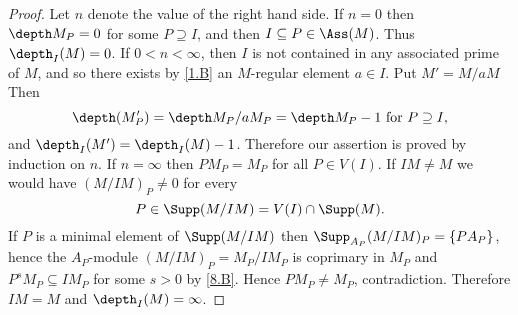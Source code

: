 \documentclass[../main]{subfiles}
\begin{document}
\begin{proof}
Let $n$ denote the value of the right hand side. If $n=0$ then $\depth M_P=0$ for some $P \supseteq I$, and then $I \subseteq P \in \Ass (M)$. Thus $\depth_I(M)=0$. If $0<n<\infty$, then $I$ is not contained in any associated prime of $M$, and so there exists by \ref{1.B} an $M$-regular element $a \in I$. Put $M'=M/aM$ Then \[\depth(M'_P)=\depth M_P / aM_P=\depth M_P-1\text{ for } P \supseteq I,\] and $\depth_I(M')=\depth_I(M)-1$. Therefore our assertion is proved by induction on $n$. If $n=\infty$ then $PM_{P}=M_P$ for all $P\in V(I)$. If $I M \neq M$ we would have $(M / I M)_P \neq 0$ for every \[P \in\Supp(M / I M)=V(I) \cap \Supp(M).\] If $P$ is a minimal element of $\Supp(M/IM)$ then $\Supp_{A_P}(M / IM)_{P}=\{PA_P\}$, hence the $A_P$-module $(M/IM)_P=M_P / I M_P$ is coprimary in $M_P$ and \newline $P^sM_P \subseteq IM_P$ for some $s>0$ by \ref{8.B}. Hence $PM_P \neq M_P$, contradiction. Therefore $IM=M$ and $\depth_I(M)=\infty$.
\end{proof}
\end{document}
